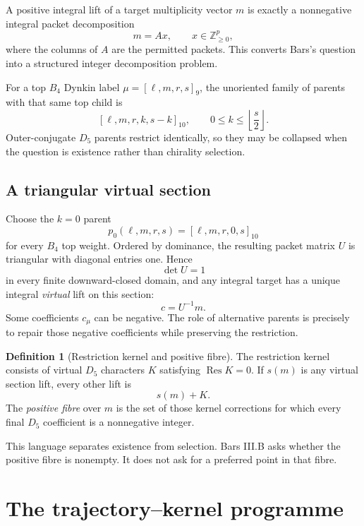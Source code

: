 \documentclass[11pt,a4paper]{article}
\theoremstyle{definition}
\newtheorem{definition}[theorem]{Definition}
\newcommand{\Res}{\operatorname{Res}}
\begin{document}
A positive integral lift of a target multiplicity vector $m$ is exactly a
nonnegative integral packet decomposition
\[
   m=Ax,
   \qquad x\in\mathbb Z_{\geq0}^{p},
\]
where the columns of $A$ are the permitted packets.  This converts Bars's
question into a structured integer decomposition problem.

For a top $B_4$ Dynkin label $\mu=[\ell,m,r,s]_9$, the unoriented family of
parents with that same top child is
\begin{equation}
\label{eq:parent-family}
   [\ell,m,r,k,s-k]_{10},
   \qquad 0\leq k\leq\left\lfloor\frac{s}{2}\right\rfloor.
\end{equation}
Outer-conjugate $D_5$ parents restrict identically, so they may be collapsed
when the question is existence rather than chirality selection.

\subsection{A triangular virtual section}

Choose the $k=0$ parent
\[
   p_0(\ell,m,r,s)=[\ell,m,r,0,s]_{10}
\]
for every $B_4$ top weight.  Ordered by dominance, the resulting packet
matrix $U$ is triangular with diagonal entries one.  Hence
\[
   \det U=1
\]
in every finite downward-closed domain, and any integral target has a unique
integral \emph{virtual} lift on this section:
\[
   c=U^{-1}m.
\]
Some coefficients $c_\mu$ can be negative.  The role of alternative parents
is precisely to repair those negative coefficients while preserving the
restriction.

\begin{definition}[Restriction kernel and positive fibre]
The restriction kernel consists of virtual $D_5$ characters $K$ satisfying
$\Res K=0$.  If $s(m)$ is any virtual section lift, every other lift is
\[
   s(m)+K.
\]
The \emph{positive fibre} over $m$ is the set of those kernel corrections for
which every final $D_5$ coefficient is a nonnegative integer.
\end{definition}

This language separates existence from selection.  Bars III.B asks whether
the positive fibre is nonempty.  It does not ask for a preferred point in
that fibre.

\section{The trajectory--kernel programme}
\end{document}
